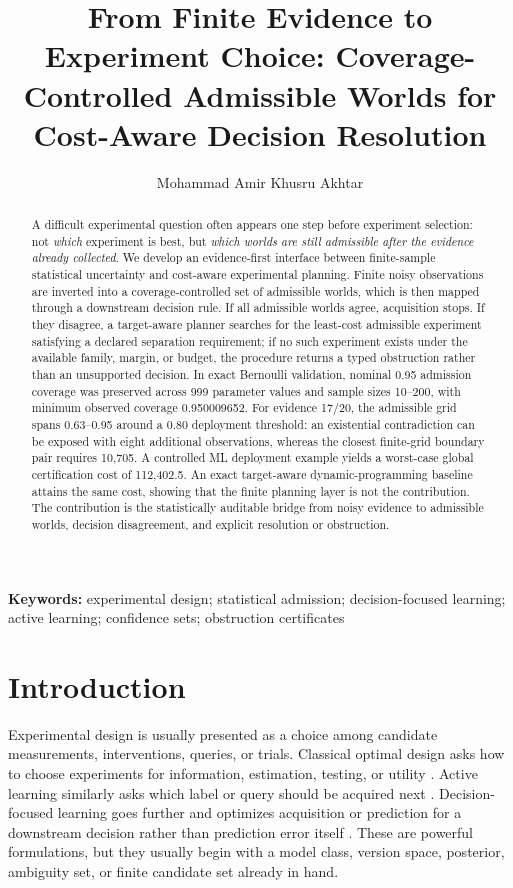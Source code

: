\documentclass[11pt]{article}
\title{From Finite Evidence to Experiment Choice: Coverage-Controlled Admissible Worlds for Cost-Aware Decision Resolution}
\author{Mohammad Amir Khusru Akhtar}
\date{}
\begin{document}
\maketitle

\begin{abstract}
A difficult experimental question often appears one step before experiment selection: not \emph{which} experiment is best, but \emph{which worlds are still admissible after the evidence already collected}. We develop an evidence-first interface between finite-sample statistical uncertainty and cost-aware experimental planning. Finite noisy observations are inverted into a coverage-controlled set of admissible worlds, which is then mapped through a downstream decision rule. If all admissible worlds agree, acquisition stops. If they disagree, a target-aware planner searches for the least-cost admissible experiment satisfying a declared separation requirement; if no such experiment exists under the available family, margin, or budget, the procedure returns a typed obstruction rather than an unsupported decision. In exact Bernoulli validation, nominal 0.95 admission coverage was preserved across 999 parameter values and sample sizes 10--200, with minimum observed coverage 0.950009652. For evidence 17/20, the admissible grid spans 0.63--0.95 around a 0.80 deployment threshold: an existential contradiction can be exposed with eight additional observations, whereas the closest finite-grid boundary pair requires 10,705. A controlled ML deployment example yields a worst-case global certification cost of 112,402.5. An exact target-aware dynamic-programming baseline attains the same cost, showing that the finite planning layer is not the contribution. The contribution is the statistically auditable bridge from noisy evidence to admissible worlds, decision disagreement, and explicit resolution or obstruction.
\end{abstract}

\noindent\textbf{Keywords:} experimental design; statistical admission; decision-focused learning; active learning; confidence sets; obstruction certificates

\section{Introduction}
Experimental design is usually presented as a choice among candidate measurements, interventions, queries, or trials. Classical optimal design asks how to choose experiments for information, estimation, testing, or utility \parencite{fisher1935,box2005,fedorov1972,pukelsheim1993,atkinson2007,lindley1956,chaloner1995,ryan2016}. Active learning similarly asks which label or query should be acquired next \parencite{settles2009,seung1992,mackay1992,cohn1996,dasgupta2005,dasgupta2007,hsu2010}. Decision-focused learning goes further and optimizes acquisition or prediction for a downstream decision rather than prediction error itself \parencite{donti2017,wilder2019,elmachtoub2022,bertsimas2020,wan2026}. These are powerful formulations, but they usually begin with a model class, version space, posterior, ambiguity set, or finite candidate set already in hand.
\end{document}
